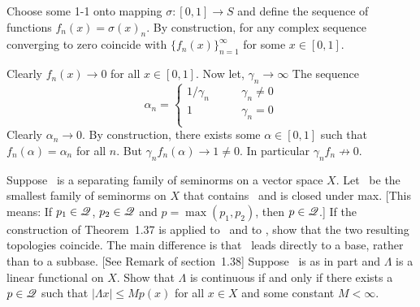 \begin{enumerate}
Choose some 1-1 onto mapping \(\sigma:[0,1]\rightarrow S\)
and define the sequence of functions
\(f_n(x) = \sigma(x)_n\).
By construction, for any complex sequence converging to zero
coincide with \(\{f_n(x)\}_{n=1}^\infty\) for some \(x\in[0,1]\).

Clearly \(f_n(x) \rightarrow 0\) for all \(x\in [0,1]\).
Now let, \(\gamma_n \rightarrow \infty\)
The sequence 
\begin{equation*}
 \alpha_n = \left\{\begin{array}{cl}
            1/\gamma_n & \qquad \gamma_n \neq 0 \\
            1          & \qquad \gamma_n = 0 \\
            \end{array}\right.
\end{equation*}
Clearly \(\alpha_n \rightarrow 0\). By construction, there exists some
\(\alpha\in [0,1]\) such that \(f_n(\alpha) = \alpha_n\) for all $n$.
But \(\gamma_n f_n(\alpha) \rightarrow 1 \neq 0\). In particular
\(\gamma_n f_n \not\rightarrow 0\).


\begin{excopy}
 \begin{itemize}
   Suppose \scrP\ is a separating family of seminorms 
   on a vector space $X$. Let \scrQ\ be the smallest family of 
   seminorms on $X$ that contains  \scrP\ and is closed under max.
   [This means: If \(p_1\in \mathscr{Q}\), \(p_2\in \mathscr{Q}\) and
   \(p = \max(p_1,p_2)\), then \(p\in \mathscr{Q}\).]
   If the construction of Theorem~1.37 is applied to \scrP\ and to \scrQ,
   show that the two resulting topologies coincide.
   The main difference is that \scrQ\ leads directly to a base,
   rather than to a subbase.
   [See Remark  of section~1.38]
   Suppose \scrQ\ is as in part  and \(\Lambda\) is a linear functional
   on $X$. Show that \(\Lambda\) is continuous if and only if there exists
   a \(p\in \mathscr{Q}\) such that \(|\Lambda x| \leq Mp(x)\)
   for all \(x\in X\) and some constant \(M< \infty\).
 \end{itemize}
\end{excopy}


\end{enumerate}
